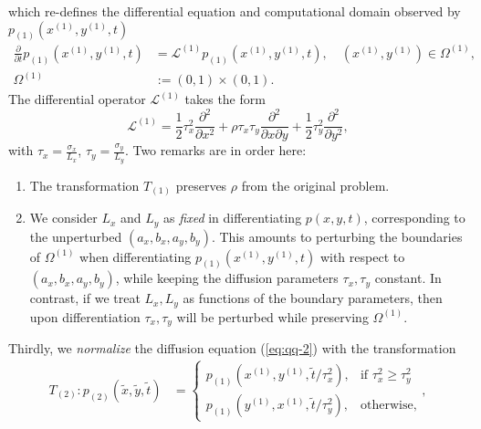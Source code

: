 which re-defines the differential equation and computational domain observed by
$p_{(1)}(x^{(1)}, y^{(1)}, t)$
\begin{align}
  \frac{\partial}{\partial t}p_{(1)}(x^{(1)}, y^{(1)}, t) &= \mathcal{L}^{(1)}p_{(1)}(x^{(1)}, y^{(1)}, t),\quad (x^{(1)},y^{(1)}) \in \Omega^{(1)}, \label{eq:qq-2} \\
  \Omega^{(1)} &:= (0,1) \times (0,1). \nonumber
\end{align}
The differential operator $\mathcal{L}^{(1)}$ takes the form
\[
  \mathcal{L}^{(1)} = \frac{1}{2} \tau_x^2 \frac{\partial^2}{\partial x^2}
  + \rho\tau_x\tau_y \frac{\partial^2}{\partial x \partial y} + \frac{1}{2}\tau_y^2 \frac{\partial^2}{\partial y^2},
\]
with $\tau_x = \frac{\sigma_x}{L_x}$,
$\tau_y = \frac{\sigma_y}{L_y}$.  Two remarks are in order here:
\begin{enumerate}
\item The transformation $T_{(1)}$ preserves $\rho$ from the original
  problem.
\item We consider $L_x$ and $L_y$ as \textit{fixed} in differentiating
  $p(x,y,t)$, corresponding to the unperturbed $(a_x, b_x, a_y,
  b_y)$. This amounts to perturbing the boundaries of $\Omega^{(1)}$
  when differentiating $p_{(1)}(x^{(1)}, y^{(1)}, t)$ with respect to
  $(a_x, b_x, a_y, b_y)$, while keeping the diffusion parameters
  $\tau_x, \tau_y$ constant. In contrast, if we treat $L_x, L_y$ as
  functions of the boundary parameters, then upon differentiation
  $\tau_x, \tau_y$ will be perturbed while preserving $\Omega^{(1)}$.
\end{enumerate}
Thirdly, we \textit{normalize} the diffusion equation (\ref{eq:qq-2}) with the transformation
\begin{align}
  T_{(2)}: p_{(2)}(\tilde{x}, \tilde{y}, \tilde{t}) &= \left\{ \begin{array}{cc}
                                                  p_{(1)}(x^{(1)}, y^{(1)}, \tilde{t}/\tau_x^2), &\mbox{if } \tau_x^2 \geq \tau_y^2 \\
                                                 p_{(1)}(y^{(1)}, x^{(1)}, \tilde{t}/\tau_y^2), &\mbox{otherwise},
                                                  \end{array} \right., \label{eq:T2}
\end{align}
